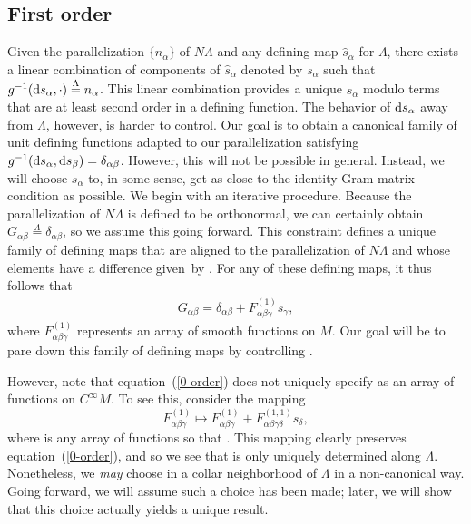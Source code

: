 \documentclass[pdftex]{sigma}
\numberwithin{equation}{section}
\renewcommand{\=}{\stackrel \Lambda =}
\begin{document}
\subsection{First order} \label{fo-Riem}
Given the parallelization $\{n_{\alpha}\}$ of $N \Lambda$ and any defining map $\hat{s}_{\alpha}$ for $\Lambda$, there exists a linear combination of components of $\hat{s}_{\alpha}$ denoted by $s_{\alpha}$ such that $g^{-1}({\rm d}s_{\alpha},\cdot) \= n_{\alpha}$. This linear combination provides a unique $s_{\alpha}$ modulo terms that are at least second order in a defining function. The behavior of ${\rm d}s_{\alpha}$ away from $\Lambda$, however, is harder to control. Our goal is to obtain a canonical family of unit defining functions adapted to our parallelization satisfying $g^{-1}({\rm d}s_{\alpha},{\rm d}s_{\beta}) = \delta_{\alpha \beta}$. However, this will not be possible in general. Instead, we will choose $s_{\alpha}$ to, in some sense, get as close to the identity Gram matrix condition as possible.
We begin with an iterative procedure. Because the parallelization of $N \Lambda$ is defined to be orthonormal, we can certainly obtain $G_{\alpha \beta} \= \delta_{\alpha \beta}$, so we assume this going forward. This constraint defines a unique family of defining maps that are aligned to the parallelization of $N \Lambda$ and whose elements have a difference given~by . For any of these defining maps, it thus follows that
\begin{align} \label{0-order}
G_{\alpha \beta} = \delta_{\alpha \beta} + F^{(1)}_{\alpha \beta \gamma} s_{\gamma} ,
\end{align}
where $F^{(1)}_{\alpha \beta \gamma}$ represents an array of smooth functions on $M$. Our goal will be to pare down this family of defining maps by controlling .

However, note that equation~(\ref{0-order}) does not uniquely specify  as an array of functions on $C^\infty M$. To see this, consider the mapping
\[
F^{(1)}_{\alpha \beta \gamma} \mapsto F^{(1)}_{\alpha \beta \gamma} + F^{(1,1)}_{\alpha \beta \gamma \delta} s_{\delta} ,
\]
where  is any array of functions so that . This mapping clearly preserves equation~(\ref{0-order}), and so we see that  is only uniquely determined along $\Lambda$. Nonetheless, we \textit{may} choose  in a collar neighborhood of $\Lambda$ in a non-canonical way. Going forward, we will assume such a choice has been made; later, we will show that this choice actually yields a unique result.
\end{document}
